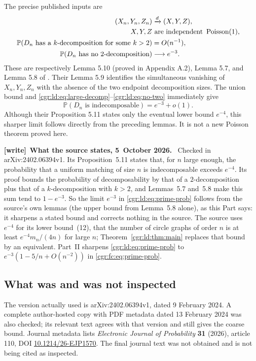 \documentclass[11pt,letterpaper]{article}
\numberwithin{equation}{section}
\theoremstyle{definition}\newtheorem{definition}[theorem]{Definition}
\theoremstyle{remark}\newtheorem{remark}[theorem]{Remark}
\newcommand{\PP}{\mathbb P}
\DeclareMathOperator{\Poi}{Poisson}
\newenvironment{writenote}[1][]{\par\smallskip\begingroup\small
 \noindent\textbf{[write]}\if\relax\detokenize{#1}\relax\else~\textbf{#1.}\fi\ }%
 {\par\endgroup\smallskip}
\begin{document}
The precise published inputs are
\begin{align}
 (X_n,Y_n,Z_n)&\xrightarrow{d}(X,Y,Z),\label{cgr:ld:eq:poi-source}\\
 X,Y,Z&\text{ are independent }\Poi(1),\notag\\
 \PP(D_n\text{ has a }k\text{-decomposition for some }k>2)
   &=O(n^{-1}),\label{cgr:ld:eq:large-decomp}\\
 \PP(D_n\text{ has no }2\text{-decomposition})&\longrightarrow e^{-3}.
 \label{cgr:ld:eq:no-two}
\end{align}
These are respectively Lemma 5.10 (proved in Appendix A.2),
Lemma 5.7, and Lemma 5.8 of \cite{BBFGP24}. Their Lemma 5.9
identifies the simultaneous vanishing of $X_n,Y_n,Z_n$ with the
absence of the two endpoint decomposition sizes. The union bound
and \eqref{cgr:ld:eq:large-decomp}--\eqref{cgr:ld:eq:no-two} immediately give
\begin{equation}\label{cgr:ld:eq:prime-prob}
 \PP(D_n\text{ is indecomposable})=e^{-3}+o(1).
\end{equation}
Although their Proposition 5.11 states only the eventual lower
bound $e^{-4}$, this sharper limit follows directly from the
preceding lemmas. It is not a new Poisson theorem proved here.
\begin{writenote}[What the source states, 5~October 2026]
Checked in arXiv:2402.06394v1. Its Proposition~5.11 states that, for $n$ large enough, the probability that a uniform matching of size $n$ is indecomposable exceeds $e^{-4}$. Its proof bounds the probability of decomposability by that of a $2$-decomposition plus that of a $k$-decomposition with $k>2$, and Lemmas~5.7 and~5.8 make this sum tend to $1-e^{-3}$. So the limit $e^{-3}$ in \eqref{cgr:ld:eq:prime-prob} follows from the source's own lemmas (the upper bound from Lemma~5.8 alone), as this Part says: it sharpens a stated bound and corrects nothing in the source. The source uses $e^{-4}$ for its lower bound~(12), that the number of circle graphs of order $n$ is at least $e^{-4}m_n/(4n)$ for large $n$; Theorem~\ref{cgr:ld:thm:main} replaces that bound by an equivalent. Part~II sharpens \eqref{cgr:ld:eq:prime-prob} to $e^{-3}(1-5/n+O(n^{-2}))$ in \eqref{cgr:fc:eq:prime-prob}.
\end{writenote}

\subsection{What was and was not inspected}\label{cgr:ld:sub:inspected}
The version actually used is arXiv:2402.06394v1, dated 9 February
2024. A complete author-hosted copy with PDF metadata dated
13 February 2024 was also checked; its relevant text agrees with
that version and still gives the coarse bound. Journal metadata
lists \emph{Electronic Journal of Probability} \textbf{31} (2026),
article 110, DOI \href{https://doi.org/10.1214/26-EJP1570}
{10.1214/26-EJP1570}. The final journal text was not obtained and
is not being cited as inspected.
\end{document}
